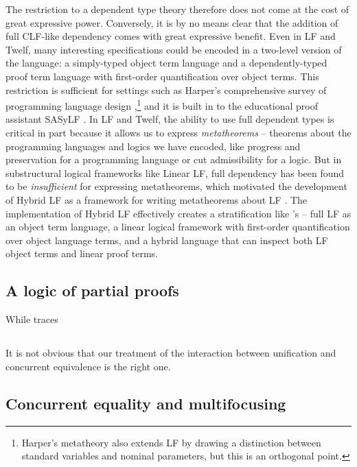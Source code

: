 The restriction to a dependent type theory therefore does not come at
the cost of great expressive power. Conversely, it is by no means
clear that the addition of full CLF-like dependency comes with great
expressive benefit. Even in LF and Twelf, many interesting
specifications could be encoded in a two-level version of the
language: a simply-typed object term language and a dependently-typed
proof term language with first-order quantification over object
terms. This restriction is sufficient for settings such as Harper's
comprehensive survey of programming language design
\cite{harper12practical},\footnote{Harper's metatheory also extends LF
  by drawing a distinction between standard variables and nominal
  parameters, but this is an orthogonal point.} and it is built in to
the educational proof assistant SASyLF \cite{aldrich08sasylf}. In LF
and Twelf, the ability to use full dependent types is critical in part
because it allows us to express {\it metatheorems} -- theorems about
the programming languages and logics we have encoded, like progress
and preservation for a programming language or cut admissibility for a
logic. But in substructural logical frameworks like Linear LF, full
dependency has been found to be {\it insufficient} for expressing
metatheorems, which motivated the development of Hybrid LF as a
framework for writing metatheorems about LF \cite{reed09hybrid}. The
implementation of Hybrid LF effectively creates a stratification like
\sls's -- full LF as an object term language, a linear logical
framework with first-order quantification over object language terms,
and a hybrid language that can inspect both LF object terms and linear
proof terms. 


\subsection{A logic of partial proofs}

While traces 

\subsection{}

It is not obvious that our treatment of the interaction between 
unification and concurrent equivalence is the right one. 

\subsection{Concurrent equality and multifocusing}

